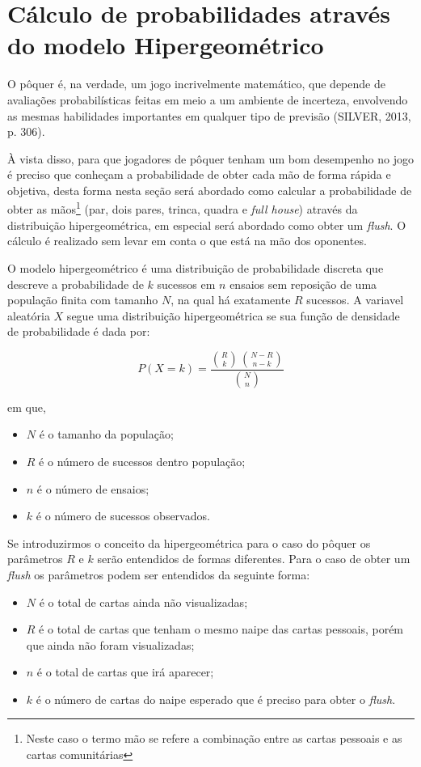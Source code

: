 \documentclass[
	12pt,				%
	oneside,			%
	a4paper,			%
	chapter=TITLE,		%
	section=TITLE,		%
	subsection=Title,	%
	subsubsection=Title,%
	brazil,				%
	]{abntex2}
\begin{document}
\newpage
\section{Cálculo de probabilidades através do modelo Hipergeométrico}
\begin{citacao}
O pôquer é, na verdade, um jogo incrivelmente matemático, que depende de avaliações probabilísticas feitas em meio a um ambiente de incerteza, envolvendo as mesmas habilidades importantes  em qualquer tipo de previsão (SILVER, 2013, p. 306).
\end{citacao}

À vista disso, para que jogadores de pôquer tenham um bom desempenho no jogo é preciso que conheçam a probabilidade de obter cada mão de forma rápida e objetiva, desta forma nesta seção será abordado como calcular a probabilidade de obter as mãos\footnote{Neste caso o termo mão se refere a combinação entre as cartas pessoais e as cartas comunitárias} (par, dois pares, trinca, quadra e \textit{full house}) através da distribuição hipergeométrica, em especial será abordado como obter um \textit{flush}. O cálculo é realizado sem levar em conta o que está na mão dos oponentes.

O modelo hipergeométrico é uma distribuição de probabilidade discreta que descreve a probabilidade de $k$ sucessos em $n$ ensaios sem reposição de uma população finita com tamanho $N$, na qual há exatamente $R$ sucessos.  A variavel aleatória $X$ segue uma distribuição hipergeométrica se sua função de densidade de probabilidade é dada por: 

\begin{equation}\label{hip}
P(X = k) = \dfrac{\binom{R}{k}\,\binom{N - R}{n - k}}{\binom{N}{n}}
\end{equation}

em que,
\begin{itemize}
\item $N$ é o tamanho da população;
\item $R$ é o número de sucessos dentro população;
\item $n$ é o número de ensaios;
\item $k$ é o número de sucessos observados.
\end{itemize}

Se introduzirmos o conceito da hipergeométrica para o caso do pôquer os parâmetros $R$ e $k$ serão entendidos de formas diferentes. Para o caso de obter um \textit{flush} os parâmetros podem ser entendidos da seguinte forma:
\newpage
\begin{itemize}
\item $N$ é o total de cartas ainda não visualizadas;
\item $R$ é o total de cartas que tenham o mesmo naipe das cartas pessoais, porém que ainda não foram visualizadas;
\item $n$ é o total de cartas que irá aparecer;
\item $k$ é o número de cartas do naipe esperado que é preciso para obter o \textit{flush}.
\end{itemize}
\end{document}
